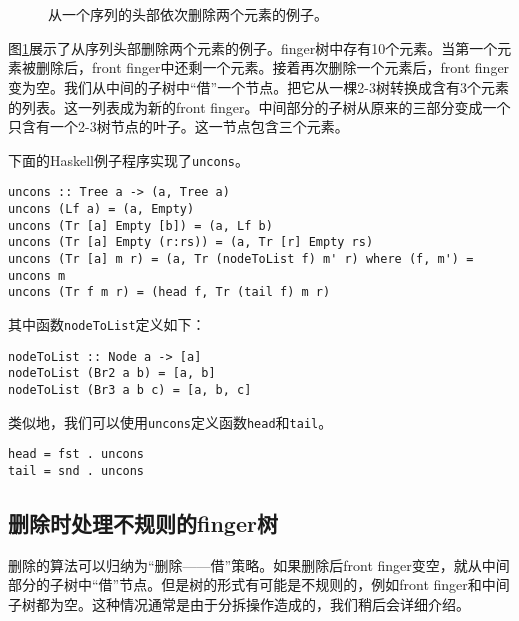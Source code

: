 \documentclass[UTF8]{article}
\begin{document}
\begin{figure}[htbp]
  \centering
   \\
   \\
  \caption{从一个序列的头部依次删除两个元素的例子。} \label{fig:ftr-uncons-example}
\end{figure}

图\ref{fig:ftr-uncons-example}展示了从序列头部删除两个元素的例子。finger树中存有10个元素。当第一个元素被删除后，front finger中还剩一个元素。接着再次删除一个元素后，front finger变为空。我们从中间的子树中“借”一个节点。把它从一棵2-3树转换成含有3个元素的列表。这一列表成为新的front finger。中间部分的子树从原来的三部分变成一个只含有一个2-3树节点的叶子。这一节点包含三个元素。

下面的Haskell例子程序实现了\texttt{uncons}。

\lstset{language=Haskell}
\begin{lstlisting}[style=Haskell]
uncons :: Tree a -> (a, Tree a)
uncons (Lf a) = (a, Empty)
uncons (Tr [a] Empty [b]) = (a, Lf b)
uncons (Tr [a] Empty (r:rs)) = (a, Tr [r] Empty rs)
uncons (Tr [a] m r) = (a, Tr (nodeToList f) m' r) where (f, m') = uncons m
uncons (Tr f m r) = (head f, Tr (tail f) m r)
\end{lstlisting}

其中函数\texttt{nodeToList}定义如下：

\begin{lstlisting}[style=Haskell]
nodeToList :: Node a -> [a]
nodeToList (Br2 a b) = [a, b]
nodeToList (Br3 a b c) = [a, b, c]
\end{lstlisting}

类似地，我们可以使用\texttt{uncons}定义函数\texttt{head}和\texttt{tail}。

\begin{lstlisting}[style=Haskell]
head = fst . uncons
tail = snd . uncons
\end{lstlisting}

\subsection{删除时处理不规则的finger树}
删除的算法可以归纳为“删除——借”策略。如果删除后front finger变空，就从中间部分的子树中“借”节点。但是树的形式有可能是不规则的，例如front finger和中间子树都为空。这种情况通常是由于分拆操作造成的，我们稍后会详细介绍。
\end{document}
